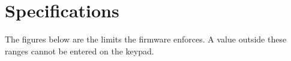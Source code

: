 \chapter{Specifications}
\label{ch:specs}

The figures below are the limits the firmware enforces. A value outside these
ranges cannot be entered on the keypad.


